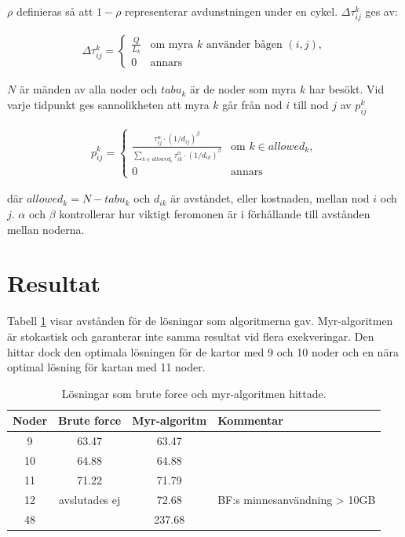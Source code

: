 \documentclass[11pt]{article}
\begin{document}
$\rho$ definieras så att $1-\rho$ representerar avdunstningen under en cykel. $\Delta\tau_{ij}^k$ ges av:

\begin{align}
	\Delta\tau_{ij}^k = \begin{cases}
		\frac{Q}{L_k} & \text{om myra } k \text{ använder bågen } (i,j), \\
		0 & \text{annars}	
	\end{cases}
\end{align}


$N$ är mänden av alla noder och $tabu_k$ är de noder som myra $k$ har besökt. Vid varje tidpunkt ges sannolikheten att myra $k$ går från nod $i$ till nod $j$ av $p_{ij}^{k}$

\begin{align}
	p_{ij}^{k} = \begin{cases}
		\frac
			{\tau_{ij}^{\alpha} \cdot (1/d_{ij})^{\beta}}
			{\sum_{k\in allowed_k} \tau_{ik}^{\alpha} \cdot (1/d_{ik})^{\beta}}  & \text{om } k \in allowed_k,\\
		0 & \text{annars}
	\end{cases}
\end{align}

där $allowed_{k} = {N - tabu_{k}}$ och $d_{ik}$ är avståndet, eller kostnaden, mellan nod $i$ och $j$. $\alpha$ och $\beta$ kontrollerar hur viktigt feromonen är i förhållande till avstånden mellan noderna.


\section{Resultat}

Tabell \ref{table_solutions} visar avstånden för de lösningar som algoritmerna gav. Myr-algoritmen är stokastisk och garanterar inte samma resultat vid flera exekveringar. Den hittar dock den optimala lösningen för de kartor med 9 och 10 noder och en nära optimal lösning för kartan med 11 noder. 

\begin{table}[h]
	\begin{center}
		\begin{tabular}{|c|c|c|l|}
			\hline  \bf Noder           & \bf Brute force & \bf Myr-algoritm & \bf Kommentar \\  \hline
			9         & 63.47           &  63.47          & \\
			10        & 64.88           &  64.88          & \\
			11        & 71.22           &  71.79          & \\
			12        & avslutades ej   &  72.68          & BF:s minnesanvändning > 10GB \\
			48        &                 &  237.68         & \\
			\hline
		\end{tabular}
	\end{center}
	\caption{Lösningar som brute force och myr-algoritmen hittade. }
	\label{table_solutions}
\end{table}
\end{document}
